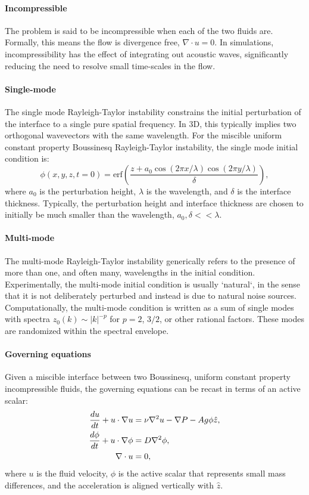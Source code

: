 \paragraph{Incompressible}
The problem is said to be incompressible when each of the two fluids are.
Formally, this means the flow is divergence free, $\nabla \cdot u = 0$.
In simulations, incompressibility has the effect of integrating out acoustic waves, significantly reducing the need to resolve small time-scales in the flow.

\paragraph{Single-mode}
The single mode Rayleigh-Taylor instability constrains the initial perturbation of the interface to a single pure spatial frequency.
In 3D, this typically implies two orthogonal wavevectors with the same wavelength.
For the miscible uniform constant property Boussinesq Rayleigh-Taylor instability, the single mode initial condition is:
\begin{equation}
\phi(x,y,z,t=0) = \text{erf}\left(\frac{z + a_0 \cos(2 \pi x / \lambda) \cos(2 \pi y/\lambda)}{\delta}\right),
\end{equation}
where $a_0$ is the perturbation height,
$\lambda$ is the wavelength, and
$\delta$ is the interface thickness.
Typically, the perturbation height and interface thickness are chosen to initially be much smaller than the wavelength, $a_0, \delta << \lambda$.

\paragraph{Multi-mode}
The multi-mode Rayleigh-Taylor instability generically refers to the presence of more than one, and often many, wavelengths in the initial condition.
Experimentally, the multi-mode initial condition is usually `natural`, in the sense that it is not deliberately perturbed and instead is due to natural noise sources.
Computationally, the multi-mode condition is written as a sum of single modes with spectra $z_0(k) \sim |k|^{-p}$ for $p = 2$, $3/2$, or other rational factors.
These modes are randomized within the spectral envelope.

\paragraph{Governing equations}
Given a miscible interface between two Boussinesq, uniform constant property incompressible fluids, the governing equations can be recast in terms of an active scalar:
\begin{align}
\frac{d u}{d t} + u \cdot \nabla u &= \nu \nabla^2 u - \nabla P - A g \phi \hat{z},\\
\frac{d \phi}{d t} + u \cdot \nabla \phi &= D \nabla^2 \phi, \\
\nabla \cdot u  &= 0,
\end{align}
where $u$ is the fluid velocity, 
$\phi$ is the active scalar that represents small mass differences,
and the acceleration is aligned vertically with $\hat{z}$.

